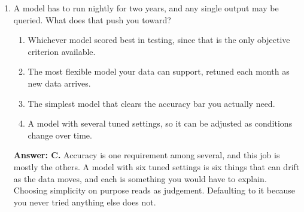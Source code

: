 \documentclass[11pt]{article}
\begin{document}
\begin{enumerate}[itemsep=14pt]
\vspace{2pt}
\textbf{Answer: D.} MSE is in squared units, so 140 means 140 squared dollars, which nobody can picture. The square root is about 12, which is back in dollars and is a sentence the owner can act on. Quote the RMSE to people, and keep the MSE for ranking models against each other.
\vspace{4pt}

\item A model has to run nightly for two years, and any single output may be queried. What does that push you toward?

\begin{enumerate}[label=\Alph*., itemsep=1pt, topsep=3pt]
  \item Whichever model scored best in testing, since that is the only objective criterion available.
  \item The most flexible model your data can support, retuned each month as new data arrives.
  \item The simplest model that clears the accuracy bar you actually need.
  \item A model with several tuned settings, so it can be adjusted as conditions change over time.
\end{enumerate}

\vspace{2pt}
\textbf{Answer: C.} Accuracy is one requirement among several, and this job is mostly the others. A model with six tuned settings is six things that can drift as the data moves, and each is something you would have to explain. Choosing simplicity on purpose reads as judgement. Defaulting to it because you never tried anything else does not.
\vspace{4pt}

\end{enumerate}
\end{document}
